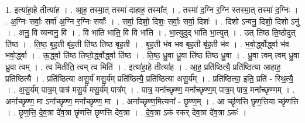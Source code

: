 \documentclass[17pt]{extarticle}
\begin{document}
1. इत्या॑हा॒हे तीत्या॑ह । . आ॒ह॒ तस्मा॒त् तस्मा॑ दाहाह॒ तस्मा᳚त् । . तस्मा॑ द॒ग्नि र॒ग्नि स्तस्मा॒त् तस्मा॑ द॒ग्निः । . अ॒ग्निः सर्वाः॒ सर्वा॑ अ॒ग्नि र॒ग्निः सर्वाः᳚ । . सर्वा॒ दिशो॒ दिशः॒ सर्वाः॒ सर्वा॒ दिशः॑ । . दिशो ऽन्वनु॒ दिशो॒ दिशो ऽनु॑ । . अनु॒ वि व्यन्वनु॒ वि । . वि भा॑ति भाति॒ वि वि भा॑ति । . भा॒त्युदुद् भा॑ति भा॒त्युत् । . उत् ति॑ष्ठ ति॒ष्ठोदुत् ति॑ष्ठ । . ति॒ष्ठ॒ बृ॒ह॒ती बृ॑ह॒ती ति॑ष्ठ तिष्ठ बृह॒ती । . बृ॒ह॒ती भ॑व भव बृह॒ती बृ॑ह॒ती भ॑व । . भ॒वो॒र्द्ध्वोर्द्ध्वा भ॑व भवो॒र्द्ध्वा । . ऊ॒र्द्ध्वा ति॑ष्ठ तिष्ठो॒र्द्ध्वोर्द्ध्वा ति॑ष्ठ । . ति॒ष्ठ॒ ध्रु॒वा ध्रु॒वा ति॑ष्ठ तिष्ठ ध्रु॒वा । . ध्रु॒वा त्वम् त्वम् ध्रु॒वा ध्रु॒वा त्वम् । . त्व मितीति॒ त्वम् त्व मिति॑ । . इत्या॑हा॒हे तीत्या॑ह । . आ॒ह॒ प्रति॑ष्ठित्यै॒ प्रति॑ष्ठित्या आहाह॒ प्रति॑ष्ठित्यै । . प्रति॑ष्ठित्या असु॒र्य॑ मसु॒र्य॑म् प्रति॑ष्ठित्यै॒ प्रति॑ष्ठित्या असु॒र्य᳚म् । . प्रति॑ष्ठित्या॒ इति॒ प्रति॑ - स्थि॒त्यै॒ । . अ॒सु॒र्य॑म् पात्र॒म् पात्र॑ मसु॒र्य॑ मसु॒र्य॑म् पात्र᳚म् । . पात्र॒ मना᳚च्छृण्ण॒ मना᳚च्छृण्ण॒म् पात्र॒म् पात्र॒ मना᳚च्छृण्णम् । . अना᳚च्छृण्ण॒ मा ऽना᳚च्छृण्ण॒ मना᳚च्छृण्ण॒ मा । . अना᳚च्छृण्ण॒मित्यना᳚ - छृ॒ण्ण॒म् । . आ च्छृ॑णत्ति छृण॒त्तिया च्छृ॑णत्ति । . छृ॒ण॒त्ति॒ दे॒व॒त्रा दे॑व॒त्रा छृ॑णत्ति छृणत्ति देव॒त्रा । . दे॒व॒त्रा ऽक॑ रकर् देव॒त्रा दे॑व॒त्रा ऽकः॑ । \newline
\end{document}
